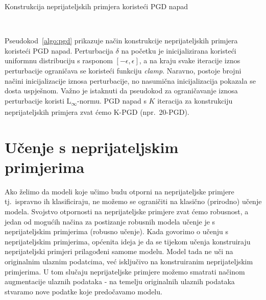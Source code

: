 \documentclass[times, utf8, zavrsni, numeric]{fer}
\begin{document}
\begin{algorithm}
    \caption{Konstrukcija neprijateljskih primjera koristeći PGD napad}
    \label{algo:pgd}
    \begin{algorithmic}
        \\\hrulefill
        \ENDFOR
    \end{algorithmic}
\end{algorithm}

\pagebreak

Pseudokod~\ref{algo:pgd} prikazuje način konstrukcije neprijateljskih primjera koristeći PGD napad. 
Perturbacija $\delta$ na početku je inicijalizirana koristeći uniformnu distribuciju s rasponom $[-\epsilon, \epsilon]$, 
a na kraju svake iteracije iznos perturbacije ograničava se koristeći funkciju \textit{clamp}. 
Naravno, postoje brojni načini inicijalizacije iznosa perturbacije, no nasumična inicijalizacija pokazala se dosta uspješnom.
Važno je istaknuti da pseudokod za ograničavanje iznosa perturbacije koristi L\textsubscript{$\infty$}-normu. 
PGD napad s $K$ iteracija za konstrukciju neprijateljskih primjera zvat ćemo K-PGD (npr.\ 20-PGD).

\section{Učenje s neprijateljskim primjerima}

Ako želimo da modeli koje učimo budu otporni na neprijateljske primjere tj.\ ispravno ih klasificiraju, ne možemo se ograničiti na klasično (prirodno) učenje modela.
Svojstvo otpornosti na neprijateljske primjere zvat ćemo robusnost, a jedan od mogućih načina za postizanje robusnih modela učenje je s neprijateljskim primjerima (robusno učenje).
Kada govorimo o učenju s neprijateljskim primjerima, općenita ideja je da se tijekom učenja konstruiraju neprijateljski primjeri prilagođeni samome modelu.
Model tada ne uči na originalnim ulaznim podatcima, već isključivo na konstruiranim neprijateljskim primjerima.
U tom slučaju neprijateljske primjere možemo smatrati načinom augmentacije ulaznih podataka - na temelju originalnih ulaznih podataka stvaramo nove podatke koje predočavamo modelu.
\end{document}
